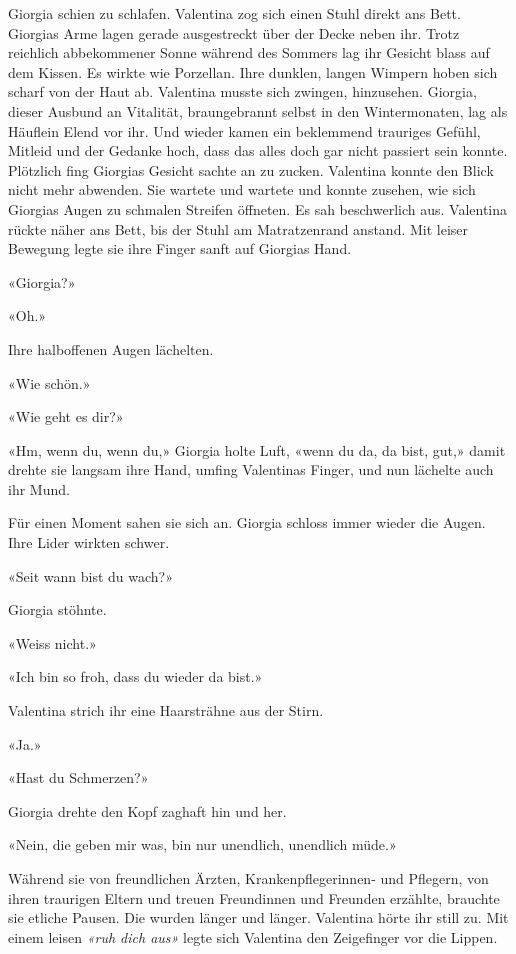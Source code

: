 Giorgia schien zu schlafen. Valentina zog sich einen Stuhl direkt ans
Bett. Giorgias Arme lagen gerade ausgestreckt über der Decke neben ihr.
Trotz reichlich abbekommener Sonne während des Sommers lag ihr Gesicht
blass auf dem Kissen. Es wirkte wie Porzellan. Ihre dunklen, langen
Wimpern hoben sich scharf von der Haut ab. Valentina musste sich
zwingen, hinzusehen. Giorgia, dieser Ausbund an Vitalität, braungebrannt
selbst in den Wintermonaten, lag als Häuflein Elend vor ihr. Und wieder
kamen ein beklemmend trauriges Gefühl, Mitleid und der Gedanke hoch,
dass das alles doch gar nicht passiert sein konnte.
Plötzlich fing Giorgias Gesicht sachte an zu zucken. Valentina konnte
den Blick nicht mehr abwenden. Sie wartete und wartete und konnte
zusehen, wie sich Giorgias Augen zu schmalen Streifen öffneten. Es sah
beschwerlich aus.
Valentina rückte näher ans Bett, bis der Stuhl am Matratzenrand anstand.
Mit leiser Bewegung legte sie ihre Finger sanft auf Giorgias Hand.

«Giorgia?»

«Oh.»

Ihre halboffenen Augen lächelten.

«Wie schön.»

«Wie geht es dir?»

«Hm, wenn du, wenn du,» Giorgia holte Luft, «wenn du da, da bist, gut,»
damit drehte sie langsam ihre Hand, umfing Valentinas Finger, und nun
lächelte auch ihr Mund.

Für einen Moment sahen sie sich an. Giorgia schloss immer wieder die
Augen. Ihre Lider wirkten schwer.

«Seit wann bist du wach?»

Giorgia stöhnte.

«Weiss nicht.»

«Ich bin so froh, dass du wieder da bist.»

Valentina strich ihr eine Haarsträhne aus der Stirn.

«Ja.»

«Hast du Schmerzen?»

Giorgia drehte den Kopf zaghaft hin und her.

«Nein, die geben mir was, bin nur unendlich, unendlich müde.»

Während sie von freundlichen Ärzten, Krankenpflegerinnen- und Pflegern,
von ihren traurigen Eltern und treuen Freundinnen und Freunden erzählte,
brauchte sie etliche Pausen. Die wurden länger und länger. Valentina
hörte ihr still zu.
Mit einem leisen \emph{«ruh dich aus»} legte sich Valentina den
Zeigefinger vor die Lippen.

